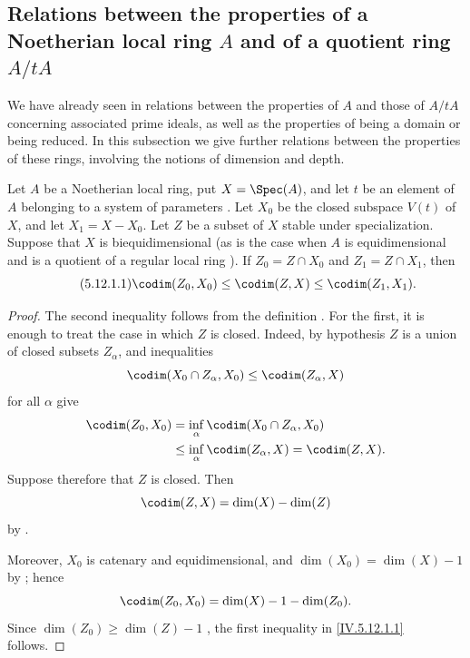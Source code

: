 \subsection{Relations between the properties of a Noetherian local
ring \texorpdfstring{$A$}{A} and of a quotient ring
\texorpdfstring{$A/tA$}{A/tA}}
\label{subsection:IV.5.12}
\label{IV.5.12}

We have already seen in  relations between the
properties of $A$ and those of $A/tA$ concerning associated prime
ideals, as well as the properties of being a domain or being
reduced.  In this subsection we give further relations between the
properties of these rings, involving the notions of dimension and
depth.

\begin{proposition}[5.12.1]
\label{IV.5.12.1}
Let $A$ be a Noetherian local ring, put $X=\Spec(A)$, and let $t$
be an element of $A$ belonging to a system of parameters
.  Let $X_0$ be the closed subspace $V(t)$ of
$X$, and let $X_1=X-X_0$.  Let $Z$ be a subset of $X$ stable
under specialization.  Suppose that $X$ is biequidimensional
(as is the case when $A$ is equidimensional and is a quotient of
a regular local ring ).  If
$Z_0=Z\cap X_0$ and $Z_1=Z\cap X_1$, then
\begin{equation}
\tag{5.12.1.1}
\label{IV.5.12.1.1}
  \codim(Z_0,X_0)\leq\codim(Z,X)\leq\codim(Z_1,X_1).
\end{equation}
\end{proposition}

\begin{proof}
The second inequality follows from the definition
.  For the first, it is enough to treat the case
in which $Z$ is closed.  Indeed, by hypothesis $Z$ is a union of
closed subsets $Z_\alpha$, and inequalities
\[
  \codim(X_0\cap Z_\alpha,X_0)\leq\codim(Z_\alpha,X)
\]
for all $\alpha$ give
\[
\begin{split}
  \codim(Z_0,X_0)
  &=\inf_\alpha\codim(X_0\cap Z_\alpha,X_0)\\
  &\leq\inf_\alpha\codim(Z_\alpha,X)
   =\codim(Z,X).
\end{split}
\]
Suppose therefore that $Z$ is closed.  Then
\[
  \codim(Z,X)=\dim(X)-\dim(Z)
\]
by .


Moreover, $X_0$ is catenary and equidimensional, and
$\dim(X_0)=\dim(X)-1$ by ; hence
\[
  \codim(Z_0,X_0)
  =\dim(X)-1-\dim(Z_0).
\]
Since $\dim(Z_0)\geq\dim(Z)-1$ , the first
inequality in \eqref{IV.5.12.1.1} follows.
\end{proof}


